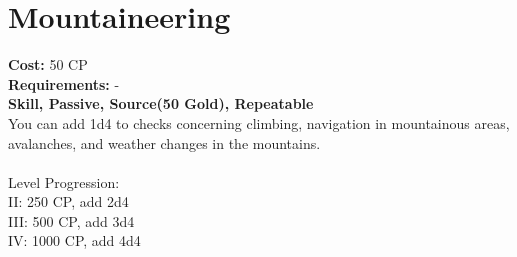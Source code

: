 \section{Mountaineering}
\textbf{Cost:} 50 CP\\
\textbf{Requirements:} -\\
\textbf{Skill, Passive, Source(50 Gold), Repeatable}\\
You can add 1d4 to checks concerning climbing, navigation in mountainous areas, avalanches, and weather changes in the mountains.\\
\\
Level Progression:\\
II: 250 CP, add 2d4\\
III: 500 CP, add 3d4\\
IV: 1000 CP, add 4d4\\